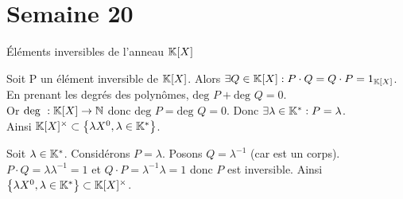 \documentclass{article}
\renewenvironment{question_kholle}[2][ ]
{
	\subsection{\texorpdfstring{#2}{}}
	\notblank{#1}
	{
		\noindent #1
		\bigbreak
	}
	{}
	\begin{proof}
}
{
	\end{proof}
}
\begin{document}
\pagebreak\section{Semaine 20}

\begin{question_kholle}
	[{\begin{equation}
					\K[X] ^\times = \left\{ \lambda X^0, \lambda \in \K^* \right\}
				\end{equation}}]
	{Éléments inversibles de l'anneau $\mathbb K[X]$}

	Soit P un élément inversible de $\mathbb K[X]$.
	Alors $\exists Q \in \mathbb K[X] : P \cdot Q = Q \cdot P = 1_{\mathbb K[X]}$.
	En prenant les degrés des polynômes, $\text{deg } P + \text{deg } Q = 0$. \\
	Or $\text{deg } : \mathbb K[X] \rightarrow \mathbb N$ donc $\text{deg } P = \text{deg } Q = 0$.
	Donc $\exists \lambda \in \mathbb K^* : P = \lambda$. \\
	Ainsi $\mathbb K[X]^\times \subset \left\{ \lambda X^0, \lambda \in \mathbb K^* \right\}$.

	Soit $\lambda \in \mathbb K^*$. Considérons $P = \lambda$.
	Posons $Q = \lambda^{-1}$ (car \K est un corps). $P \cdot Q = \lambda \lambda^{-1} = 1$ et $Q \cdot P = \lambda^{-1} \lambda = 1$ donc $P$ est inversible. Ainsi $\left\{ \lambda X^0, \lambda \in \mathbb K^* \right\} \subset \mathbb K[X]^\times$.
\end{question_kholle}
\end{document}
